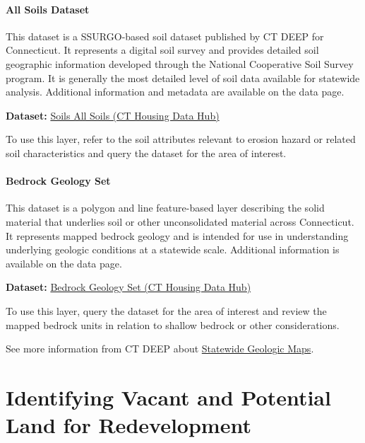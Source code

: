 \documentclass[
  letterpaper,
  DIV=11,
  numbers=noendperiod]{scrreprt}
\begin{document}
\subsubsection{All Soils Dataset}\label{sec-all-soils}

This dataset is a SSURGO-based soil dataset published by CT DEEP for
Connecticut. It represents a digital soil survey and provides detailed
soil geographic information developed through the National Cooperative
Soil Survey program. It is generally the most detailed level of soil
data available for statewide analysis. Additional information and
metadata are available on the data page.

\textbf{Dataset:}
\href{https://housingmaps.ct.gov/datasets/CTDEEP::soils-all-soils/about}{Soils
All Soils (CT Housing Data Hub)}

To use this layer, refer to the soil attributes relevant to erosion
hazard or related soil characteristics and query the dataset for the
area of interest.

\subsubsection{Bedrock Geology Set}\label{sec-bedrock-geology-set}

This dataset is a polygon and line feature-based layer describing the
solid material that underlies soil or other unconsolidated material
across Connecticut. It represents mapped bedrock geology and is intended
for use in understanding underlying geologic conditions at a statewide
scale. Additional information is available on the data page.

\textbf{Dataset:}
\href{https://housingmaps.ct.gov/maps/a765e96b0c05413da1dcbea0ae86707d/about}{Bedrock
Geology Set (CT Housing Data Hub)}

To use this layer, query the dataset for the area of interest and review
the mapped bedrock units in relation to shallow bedrock or other
considerations.

See more information from CT DEEP about
\href{https://portal.ct.gov/DEEP/Geology/Statewide-Geologic-Maps}{Statewide
Geologic Maps}.


\chapter{Identifying Vacant and Potential Land for
Redevelopment}\label{identifying-vacant-and-potential-land-for-redevelopment}
\end{document}

